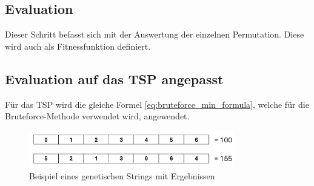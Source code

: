 %
%
%
%
\subsection{Evaluation
\label{buch:paper:varalg:subsection:evaluation}}
Dieser Schritt befasst sich mit der Auswertung der einzelnen 
Permutation. Diese wird auch als Fitnessfunktion definiert.

\subsection{Evaluation auf das TSP angepasst
\label{buch:paper:varalg:subsection:evaluation_tsp}}
Für das TSP wird die gleiche Formel \eqref{eq:bruteforce_min_formula},
welche für die Bruteforce-Methode verwendet wird, angewendet.
\begin{figure}
	\centering
	\includegraphics[width=0.8\textwidth]{
        papers/varalg/images/teil3/03GeneticStringCitiesResults.png
        }
	\caption{Beispiel eines genetischen Strings mit Ergebnissen}
	\label{fig:cities_genetic_string_results}
\end{figure}
